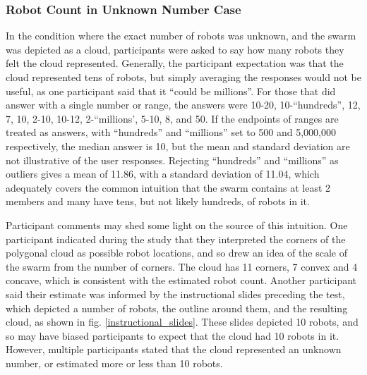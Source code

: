 \subsubsection{Robot Count in Unknown Number Case}

In the condition where the exact number of robots was unknown, and the swarm was depicted as a cloud, participants were asked to say how many robots they felt the cloud represented. 
Generally, the participant expectation was that the cloud represented tens of robots, but simply averaging the responses would not be useful, as one participant said that it ``could be millions''. 
For those that did answer with a single number or range, the answers were 10-20, 10-``hundreds'', 12, 7, 10, 2-10, 10-12, 2-``millions', 5-10, 8, and 50. 
If the endpoints of ranges are treated as answers, with ``hundreds'' and ``millions'' set to 500 and 5,000,000 respectively, the median answer is 10, but the mean and standard deviation are not illustrative of the user responses. 
Rejecting ``hundreds'' and ``millions'' as outliers gives a mean of 11.86, with a standard deviation of 11.04, which adequately covers the common intuition that the swarm contains at least 2 members and many have tens, but not likely hundreds, of robots in it.

Participant comments may shed some light on the source of this intuition. 
One participant indicated during the study that they interpreted the corners of the polygonal cloud as possible robot locations, and so drew an idea of the scale of the swarm from the number of corners. 
The cloud has 11 corners, 7 convex and 4 concave, which is consistent with the estimated robot count. 
Another participant said their estimate was informed by the instructional slides preceding the test, which depicted a number of robots, the outline around them, and the resulting cloud, as shown in fig. \ref{instructional_slides}. 
These slides depicted 10 robots, and so may have biased participants to expect that the cloud had 10 robots in it. 
However, multiple participants stated that the cloud represented an unknown number, or estimated more or less than 10 robots.

